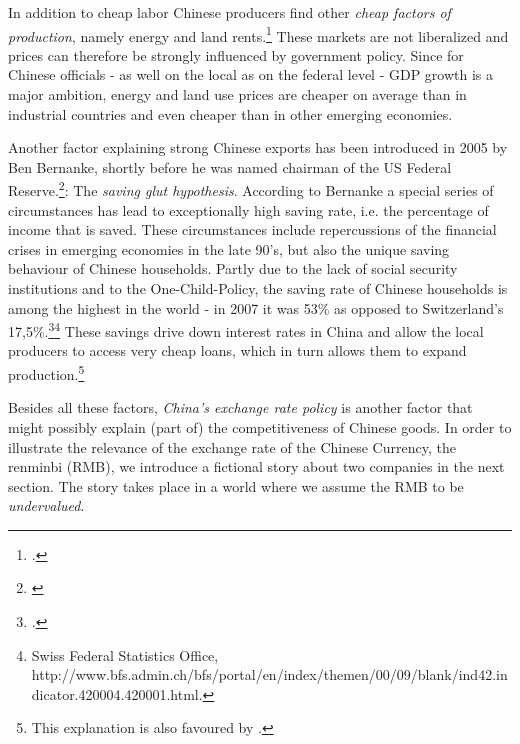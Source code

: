 \documentclass[11pt]{article}
\begin{document}
In addition to cheap labor Chinese producers find other \emph{cheap factors of production}, namely energy and land rents.\footnote{\cite[pp. 25]{Huang2010}.} These markets are not liberalized and prices can therefore be strongly influenced by government policy. Since for Chinese officials - as well on the local as on the federal level - GDP growth is a major ambition, energy and land use prices are cheaper on average than in industrial countries and even cheaper than in other emerging economies.

Another factor explaining strong Chinese exports has been introduced in 2005 by Ben Bernanke, shortly before he was named chairman of the US Federal Reserve.\footnote{\cite{Bernanke2005}}: The \emph{saving glut hypothesis}. According to Bernanke a special series of circumstances has lead to exceptionally high saving rate, i.e. the percentage of income that is saved. These circumstances include repercussions of the financial crises in emerging economies in the late 90's, but also the unique saving behaviour of Chinese households. Partly due to the lack of social security institutions and to the One-Child-Policy, the saving rate of Chinese households is among the highest in the world - in 2007 it was 53\% as opposed to Switzerland's 17,5\%.\footnote{\cite[pp. 20]{Taoyang2011}.}\footnote{Swiss Federal Statistics Office, http://www.bfs.admin.ch/bfs/portal/en/index/themen/00/09/blank/ind42.indicator.420004.420001.html.} These savings drive down interest rates in China and allow the local producers to access very cheap loans, which in turn allows them to expand production.\footnote{This explanation is also favoured by \cite[pp. 41]{Wyplosz2010}.}

Besides all these factors, \emph{China's exchange rate policy} is another factor that might possibly explain (part of) the competitiveness of Chinese goods. In order to illustrate the relevance of the exchange rate of the Chinese Currency, the renminbi (RMB), we introduce a fictional story about two companies in the next section. The story takes place in a world where we assume the RMB to be \emph{undervalued}. 





\end{document}
